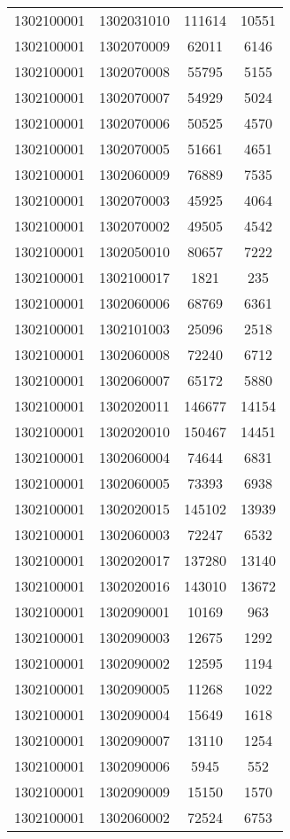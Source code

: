 \begin{longtable}[h]{llcc}
		1302100001 & 1302031010 & 111614 & 10551\\
		1302100001 & 1302070009 & 62011 & 6146\\
		1302100001 & 1302070008 & 55795 & 5155\\
		1302100001 & 1302070007 & 54929 & 5024\\
		1302100001 & 1302070006 & 50525 & 4570\\
		1302100001 & 1302070005 & 51661 & 4651\\
		1302100001 & 1302060009 & 76889 & 7535\\
		1302100001 & 1302070003 & 45925 & 4064\\
		1302100001 & 1302070002 & 49505 & 4542\\
		1302100001 & 1302050010 & 80657 & 7222\\
		1302100001 & 1302100017 & 1821 & 235\\
		1302100001 & 1302060006 & 68769 & 6361\\
		1302100001 & 1302101003 & 25096 & 2518\\
		1302100001 & 1302060008 & 72240 & 6712\\
		1302100001 & 1302060007 & 65172 & 5880\\
		1302100001 & 1302020011 & 146677 & 14154\\
		1302100001 & 1302020010 & 150467 & 14451\\
		1302100001 & 1302060004 & 74644 & 6831\\
		1302100001 & 1302060005 & 73393 & 6938\\
		1302100001 & 1302020015 & 145102 & 13939\\
		1302100001 & 1302060003 & 72247 & 6532\\
		1302100001 & 1302020017 & 137280 & 13140\\
		1302100001 & 1302020016 & 143010 & 13672\\
		1302100001 & 1302090001 & 10169 & 963\\
		1302100001 & 1302090003 & 12675 & 1292\\
		1302100001 & 1302090002 & 12595 & 1194\\
		1302100001 & 1302090005 & 11268 & 1022\\
		1302100001 & 1302090004 & 15649 & 1618\\
		1302100001 & 1302090007 & 13110 & 1254\\
		1302100001 & 1302090006 & 5945 & 552\\
		1302100001 & 1302090009 & 15150 & 1570\\
		1302100001 & 1302060002 & 72524 & 6753\\

\end{longtable}
